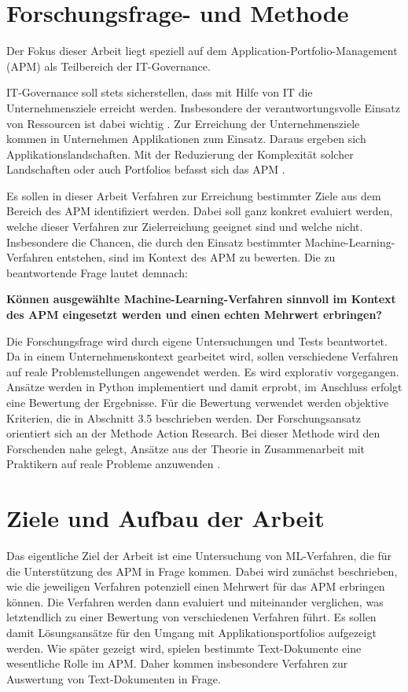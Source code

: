 \section{Forschungsfrage- und Methode}

Der Fokus dieser Arbeit liegt speziell auf dem Application-Portfolio-Management (APM) als Teilbereich der IT-Governance. 

IT-Governance soll stets sicherstellen, dass mit Hilfe von IT die Unternehmensziele erreicht werden. Insbesondere der verantwortungsvolle Einsatz von Ressourcen ist dabei wichtig \cite{rueter}. Zur Erreichung der Unternehmensziele kommen in Unternehmen Applikationen zum Einsatz. Daraus ergeben sich Applikationslandschaften. Mit der Reduzierung der Komplexität solcher Landschaften oder auch Portfolios befasst sich das APM \cite{schoder}. 

Es sollen in dieser Arbeit Verfahren zur Erreichung bestimmter Ziele aus dem Bereich des APM identifiziert werden. Dabei soll ganz konkret evaluiert werden, welche dieser Verfahren zur Zielerreichung geeignet sind und welche nicht. Insbesondere die Chancen, die durch den Einsatz bestimmter Machine-Learning-Verfahren entstehen, sind im Kontext des APM zu bewerten. Die zu beantwortende Frage lautet demnach: 

{\bf Können ausgewählte Machine-Learning-Verfahren sinnvoll im Kontext des APM eingesetzt werden und einen echten Mehrwert erbringen?}

Die Forschungsfrage wird durch eigene Untersuchungen und Tests beantwortet. Da in einem Unternehmenskontext gearbeitet wird, sollen verschiedene Verfahren auf reale Problemstellungen angewendet werden. Es wird explorativ vorgegangen. Ansätze werden in Python implementiert und damit erprobt, im Anschluss erfolgt eine Bewertung der Ergebnisse. Für die Bewertung verwendet werden objektive Kriterien, die in Abschnitt 3.5 beschrieben werden. Der Forschungsansatz orientiert sich an der Methode Action Research. Bei dieser Methode wird den Forschenden nahe gelegt, Ansätze aus der Theorie in Zusammenarbeit mit Praktikern auf reale Probleme anzuwenden \cite{Avison}. 


\section{Ziele und Aufbau der Arbeit}

Das eigentliche Ziel der Arbeit ist eine Untersuchung von ML-Verfahren, die für die Unterstützung des APM in Frage kommen. Dabei wird zunächst beschrieben, wie die jeweiligen Verfahren potenziell einen Mehrwert für das APM erbringen können. Die Verfahren werden dann evaluiert und miteinander verglichen, was letztendlich zu einer Bewertung von verschiedenen Verfahren führt. Es sollen damit Lösungsansätze für den Umgang mit Applikationsportfolios aufgezeigt werden. Wie später gezeigt wird, spielen bestimmte Text-Dokumente eine wesentliche Rolle im APM. Daher kommen insbesondere Verfahren zur Auswertung von Text-Dokumenten in Frage. 

